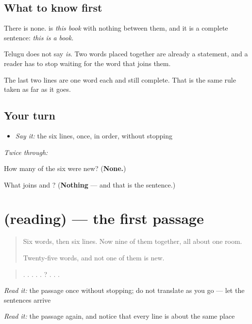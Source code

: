 \subsection*{What to know first}
There is none. \textbf{ } is \emph{this book} with nothing between them, and it is a complete sentence: \emph{this is a book}.

Telugu does not say \emph{is}. Two words placed together are already a statement, and a reader has to stop waiting for the word that joins them.

The last two lines are one word each and still complete. That is the same rule taken as far as it goes.

\subsection*{Your turn}
\begin{itemize}
\raggedright
  \item \emph{Say it:} the six lines, once, in order, without stopping
\end{itemize}

\emph{Twice through:}

\begin{tcolorbox}[breakable,colback=teal!4,colframe=teal!35!black,title={Before you move on}]
How many of the six were new? (\textbf{None.})

What joins \textbf{} and \textbf{}? (\textbf{Nothing} — and that is the sentence.)
\end{tcolorbox}
\section[(reading)]{(reading) — the first passage}

\label{lesson:TE-C83-modati-chadavu}



\begin{quote}
Six words, then six lines. Now nine of them together, all about one room.

Twenty-five words, and not one of them is new.
\end{quote}

\begin{tcolorbox}[breakable,skin=enhanced,colback=orange!6,colframe=orange!45!black,boxrule=0.5pt,arc=1mm,left=6pt,right=6pt,top=4pt,bottom=4pt,fonttitle=\bfseries,title={Read this}]
\begin{quote}
 .  .  .   .   .   ?   .    .   .
\end{quote}

\emph{Read it:} the passage once without stopping; do not translate as you go — let the sentences arrive

\emph{Read it:} the passage again, and notice that every line is about the same place
\end{tcolorbox}

